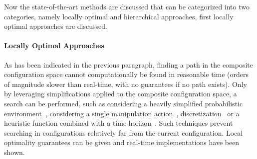 Now the state-of-the-art methods are discussed that can be categorized into two categories, namely locally optimal and hierarchical approaches, first locally optimal approaches are discussed.\bs

\paragraph{Locally Optimal Approaches}
As has been indicated in the previous paragraph, finding a path in the composite configuration space cannot computationally be found in reasonable time (orders of magnitude slower than real-time, with no guarantees if no path exists). Only by leveraging simplifications applied to the composite configuration space, a search can be performed, such as considering a heavily simplified probabilistic environment~\cite{vandenberg_path_2009}, considering a single manipulation action~\cite{berenson_manipulation_2009}, discretization~\cite{sabbaghnovin_optimal_2016} or a heuristic function combined with a time horizon~\cite{sabbaghnovin_optimal_2016}. Such techniques prevent searching in configurations relatively far from the current configuration. Local optimality guarantees can be given and real-time implementations have been shown.\bs

